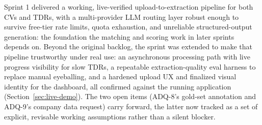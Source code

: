 Sprint 1 delivered a working, live-verified upload-to-extraction pipeline
for both CVs and TDRs, with a multi-provider LLM routing layer robust
enough to survive free-tier rate limits, quota exhaustion, and unreliable
structured-output generation: the foundation the matching and scoring work
in later sprints depends on. Beyond the original backlog, the sprint was
extended to make that pipeline trustworthy under real use: an asynchronous
processing path with live progress visibility for slow TDRs, a repeatable
extraction-quality eval harness to replace manual eyeballing, and a
hardened upload UX and finalized visual identity for the dashboard, all
confirmed against the running application (Section~\ref{sec:live-demo}).
The two open items (ADQ-8's gold-set annotation and ADQ-9's company data
request) carry forward, the latter now tracked as a set of explicit,
revisable working assumptions rather than a silent blocker.
